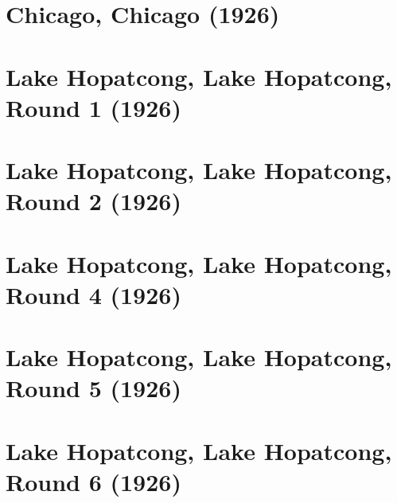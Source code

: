 \documentclass[11pt]{article}
\begin{document}


\clearpage



\clearpage



\clearpage



\clearpage



\clearpage



\clearpage



\clearpage

\section{Chicago, Chicago (1926)}


\clearpage



\clearpage

\section{Lake Hopatcong, Lake Hopatcong, Round 1 (1926)}


\clearpage

\section{Lake Hopatcong, Lake Hopatcong, Round 2 (1926)}


\clearpage

\section{Lake Hopatcong, Lake Hopatcong, Round 4 (1926)}


\clearpage

\section{Lake Hopatcong, Lake Hopatcong, Round 5 (1926)}


\clearpage

\section{Lake Hopatcong, Lake Hopatcong, Round 6 (1926)}

\end{document}

